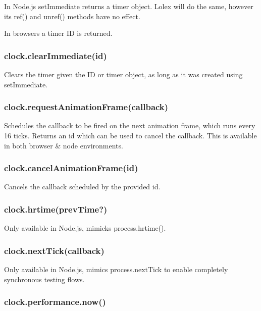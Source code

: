In Node.\+js {\ttfamily set\+Immediate} returns a timer object. Lolex will do the same, however its {\ttfamily ref()} and {\ttfamily unref()} methods have no effect.

In browsers a timer ID is returned.

\subsubsection*{{\ttfamily clock.\+clear\+Immediate(id)}}

Clears the timer given the ID or timer object, as long as it was created using {\ttfamily set\+Immediate}.

\subsubsection*{{\ttfamily clock.\+request\+Animation\+Frame(callback)}}

Schedules the callback to be fired on the next animation frame, which runs every 16 ticks. Returns an {\ttfamily id} which can be used to cancel the callback. This is available in both browser \& node environments.

\subsubsection*{{\ttfamily clock.\+cancel\+Animation\+Frame(id)}}

Cancels the callback scheduled by the provided id.

\subsubsection*{{\ttfamily clock.\+hrtime(prev\+Time?)}}

Only available in Node.\+js, mimicks process.\+hrtime().

\subsubsection*{{\ttfamily clock.\+next\+Tick(callback)}}

Only available in Node.\+js, mimics {\ttfamily process.\+next\+Tick} to enable completely synchronous testing flows.

\subsubsection*{{\ttfamily clock.\+performance.\+now()}}

